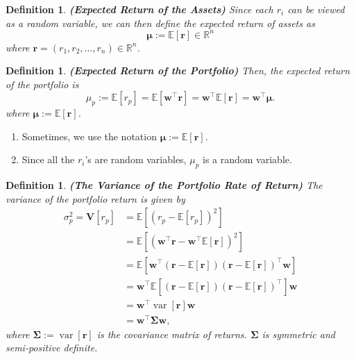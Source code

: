 \documentclass[13pt]{article}
\newtheorem{definition}[theorem]{Definition}
\theoremstyle{definition}
\theoremstyle{remark}
\newenvironment{remark}
  {\pushQED{\qed}\renewcommand{\qedsymbol}{$\triangle$}\remarkx}
  {\popQED\endremarkx}
\newcommand{\VV}{\mathbb{\mathbf{V}}}
\begin{document}
\begin{definition}\label{def:Expected Return of the Assets}
    \textbf{(Expected Return of the Assets)} Since each $r_i$ can be viewed as a random variable, we can then define the expected return of assets as
\[
\bm{\mu}:= \mathbb{E}[\bm{r}]\in \mathbb{R}^n
\]
where $\bm{r}=(r_1, r_2, \ldots, r_n)\in \mathbb{R}^n$.
\end{definition}

\begin{definition}\label{def:(Expected Return of the Portfolio} \textbf{(Expected Return of the Portfolio)}
    Then, the expected return of the portfolio is  
$$
\mu_p:=\mathbb{E}\left[r_{p}\right] =\mathbb{E}\left[\bm{w}^{\top} \bm{r}\right]
=\bm{w}^{\top} \mathbb{E}[\bm{r}] 
=\bm{w}^{\top} \bm{\mu}.
$$
where $\bm{\mu}:=\mathbb{E}[\bm{r}]$. 
\end{definition}
\begin{remark}\hfill
\begin{enumerate}
    \item Sometimes, we use the notation $\bm{\mu}:=\mathbb{E}\left[\bm{r}\right]$.
    \item Since all the $r_i$'s are random variables, $\mu_p$ is a random variable.
\end{enumerate}
    
\end{remark}

\begin{definition}\label{def:The Variance of the Portfolio Return}
    \textbf{(The Variance of the Portfolio Rate of Return)} The variance of the portfolio return is given by
$$
\begin{aligned}
\sigma_p^2 =\VV\left[r_{p}\right] & =\mathbb{E}\left[\left(r_{p}-\mathbb{E}\left[r_{p}\right]\right)^{2}\right] \\
& =\mathbb{E}\left[\left(\bm{w}^{\top} \bm{r}-\bm{w}^{\top} \mathbb{E}[\bm{r}]\right)^{2}\right] \\
& =\mathbb{E}\left[\bm{w}^{\top}(\bm{r}-\mathbb{E}[\bm{r}])(\bm{r}-\mathbb{E}[\bm{r}])^{\top} \bm{w}\right] \\
& =\bm{w}^{\top} \mathbb{E}\left[(\bm{r}-\mathbb{E}[\bm{r}])(\bm{r}-\mathbb{E}[\bm{r}])^{\top}\right] \bm{w} \\
& =\bm{w}^{\top} \operatorname{var}[\bm{r}] \bm{w} \\
& =\bm{w}^{\top} \mathbf{\Sigma} \bm{w},
\end{aligned}
$$
where $\mathbf{\Sigma}:=\operatorname{var}[\bm{r}]$ is the covariance matrix of returns. $\mathbf{\Sigma}$ is symmetric and semi-positive definite.
\end{definition}
\end{document}
